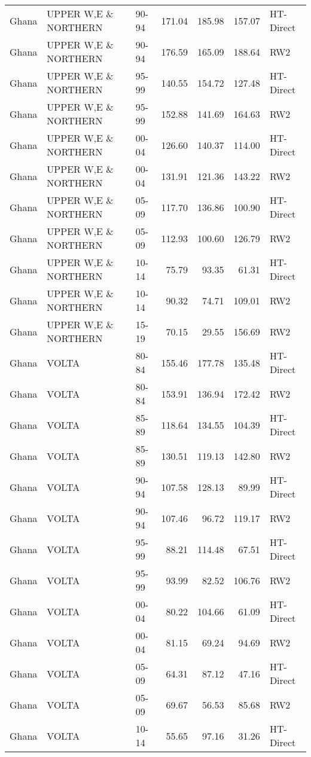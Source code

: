 \begin{longtable}{lllrrrl}
  Ghana & UPPER W,E \& NORTHERN & 90-94 & 171.04 & 185.98 & 157.07 & HT-Direct \\ 
  Ghana & UPPER W,E \& NORTHERN & 90-94 & 176.59 & 165.09 & 188.64 & RW2 \\ 
  Ghana & UPPER W,E \& NORTHERN & 95-99 & 140.55 & 154.72 & 127.48 & HT-Direct \\ 
  Ghana & UPPER W,E \& NORTHERN & 95-99 & 152.88 & 141.69 & 164.63 & RW2 \\ 
  Ghana & UPPER W,E \& NORTHERN & 00-04 & 126.60 & 140.37 & 114.00 & HT-Direct \\ 
  Ghana & UPPER W,E \& NORTHERN & 00-04 & 131.91 & 121.36 & 143.22 & RW2 \\ 
  Ghana & UPPER W,E \& NORTHERN & 05-09 & 117.70 & 136.86 & 100.90 & HT-Direct \\ 
  Ghana & UPPER W,E \& NORTHERN & 05-09 & 112.93 & 100.60 & 126.79 & RW2 \\ 
  Ghana & UPPER W,E \& NORTHERN & 10-14 & 75.79 & 93.35 & 61.31 & HT-Direct \\ 
  Ghana & UPPER W,E \& NORTHERN & 10-14 & 90.32 & 74.71 & 109.01 & RW2 \\ 
  Ghana & UPPER W,E \& NORTHERN & 15-19 & 70.15 & 29.55 & 156.69 & RW2 \\ 
  Ghana & VOLTA & 80-84 & 155.46 & 177.78 & 135.48 & HT-Direct \\ 
  Ghana & VOLTA & 80-84 & 153.91 & 136.94 & 172.42 & RW2 \\ 
  Ghana & VOLTA & 85-89 & 118.64 & 134.55 & 104.39 & HT-Direct \\ 
  Ghana & VOLTA & 85-89 & 130.51 & 119.13 & 142.80 & RW2 \\ 
  Ghana & VOLTA & 90-94 & 107.58 & 128.13 & 89.99 & HT-Direct \\ 
  Ghana & VOLTA & 90-94 & 107.46 & 96.72 & 119.17 & RW2 \\ 
  Ghana & VOLTA & 95-99 & 88.21 & 114.48 & 67.51 & HT-Direct \\ 
  Ghana & VOLTA & 95-99 & 93.99 & 82.52 & 106.76 & RW2 \\ 
  Ghana & VOLTA & 00-04 & 80.22 & 104.66 & 61.09 & HT-Direct \\ 
  Ghana & VOLTA & 00-04 & 81.15 & 69.24 & 94.69 & RW2 \\ 
  Ghana & VOLTA & 05-09 & 64.31 & 87.12 & 47.16 & HT-Direct \\ 
  Ghana & VOLTA & 05-09 & 69.67 & 56.53 & 85.68 & RW2 \\ 
  Ghana & VOLTA & 10-14 & 55.65 & 97.16 & 31.26 & HT-Direct \\ 

\end{longtable}
